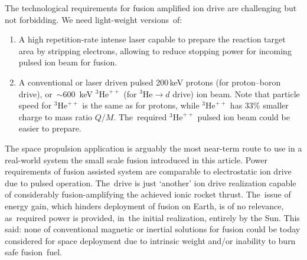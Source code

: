 \documentclass[particles,article,accept,pdftex,moreauthors]{Definitions/mdpi}
\begin{document}
The technological requirements for fusion amplified ion drive are challenging but not forbidding. We need light-weight versions~of:
\begin{enumerate}
\item 
A high repetition-rate intense laser capable to prepare the reaction target area by stripping electrons, allowing to reduce stopping power for incoming pulsed ion beam for fusion. 
\item
A conventional or laser driven pulsed 200\,keV protons (for proton--boron drive), or~$\sim$600~keV ${}^3\mathrm{He}^{++}$ (for ${}^3\mathrm{He}\to d$ drive) ion beam. Note that particle speed for ${}^3\mathrm{He}^{++}$ is the same as for protons, while ${}^3\mathrm{He}^{++}$ has 33\% smaller charge to mass ratio $Q/M$. The~required ${}^3\mathrm{He}^{++}$ pulsed ion beam could be easier to prepare.
\end{enumerate}

The space propulsion application is arguably the most near-term route to use in a real-world system the small scale fusion introduced in this article. Power requirements of fusion assisted system are comparable to electrostatic ion drive due to pulsed operation. The~drive is just `another' ion drive realization capable of considerably fusion-amplifying the achieved ionic rocket thrust. The~issue of energy gain, which hinders deployment of fusion on Earth, is of no relevance, as~required power is provided, in~the initial realization, entirely by the Sun. This said: none of conventional magnetic or inertial solutions for fusion could be today considered for space deployment due to intrinsic weight and/or inability to burn safe fusion~fuel. 

\clearpage 
\end{document}
